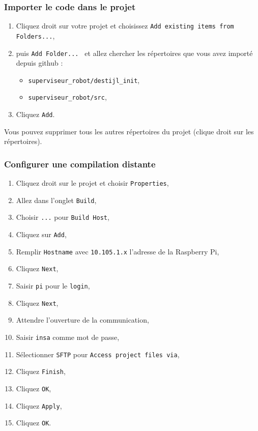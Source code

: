 \documentclass[11pt]{paper}
\newcommand{\raspi}{Raspberry Pi\xspace}
\begin{document}
\subsubsection{Importer le code dans le projet}

\begin{enumerate}
\item Cliquez droit sur votre projet et choisissez {\tt Add existing items from Folders...},
\item puis {\tt Add Folder... } et allez chercher les répertoires que vous avez importé depuis github :
\begin{itemize}
\item {\tt superviseur\_robot/destijl\_init},
\item {\tt superviseur\_robot/src},
\end{itemize}
\item Cliquez {\tt Add}.
\end{enumerate}

Vous pouvez supprimer tous les autres répertoires du projet (clique droit sur les répertoires).

\subsubsection{Configurer une compilation distante}
\label{sec:cible}

\begin{enumerate}
\item Cliquez droit sur le projet et choisir {\tt Properties},
\item Allez dans l'onglet {\tt Build},
\item Choisir {\tt ...} pour {\tt Build Host},
\item Cliquez sur {\tt Add},
\item Remplir {\tt Hostname} avec {\tt 10.105.1.x} l'adresse de la \raspi,
\item Cliquez {\tt Next},
\item Saisir {\tt pi} pour le {\tt login},
\item Cliquez {\tt Next},
\item Attendre l'ouverture de la communication,
\item Saisir {\tt insa} comme mot de passe,
\item Sélectionner {\tt  SFTP} pour {\tt Access project files via},
\item Cliquez {\tt Finish},
\item Cliquez {\tt OK},
\item Cliquez {\tt Apply},
\item Cliquez {\tt OK}.
\end{enumerate}
\end{document}
